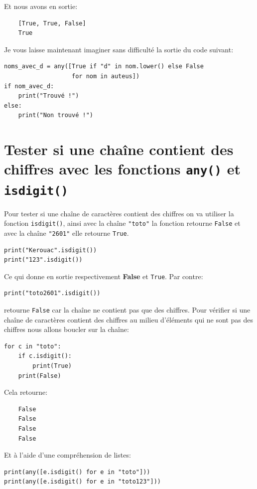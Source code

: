 \documentclass[a4paper,11pt]{book}
\begin{document}
Et nous avons en sortie:
\begin{verbatim}
    [True, True, False]
    True
\end{verbatim}
\medskip

Je vous laisse maintenant imaginer sans difficulté la sortie du code suivant:
\begin{lstlisting}
noms_avec_d = any([True if "d" in nom.lower() else False 
                   for nom in auteus])
if nom_avec_d:
    print("Trouvé !")
else:
    print("Non trouvé !")
\end{lstlisting}
\medskip

\section{Tester si une chaîne contient des chiffres avec les fonctions \texttt{any()} et \texttt{isdigit()}}
Pour tester si une chaîne de caractères contient des chiffres on va utiliser la fonction \texttt{isdigit()}, ainsi avec la chaîne \verb|"toto"| la fonction retourne \texttt{False} et avec la chaîne \verb|"2601"| elle retourne \texttt{True}.
\begin{lstlisting}
print("Kerouac".isdigit())
print("123".isdigit())
\end{lstlisting}
\medskip

Ce qui donne en sortie respectivement \textbf{False} et \texttt{True}. Par contre:
\begin{lstlisting}
print("toto2601".isdigit())
\end{lstlisting}
\medskip

retourne \texttt{False} car la chaîne ne contient pas que des chiffres. Pour vérifier si une chaîne de caractères contient des chiffres au milieu d'éléments qui ne sont pas des chiffres nous allons boucler sur la chaîne:
\begin{lstlisting}
for c in "toto":
    if c.isdigit():
        print(True)
    print(False)
\end{lstlisting}
\medskip

Cela retourne:
\begin{verbatim}
    False
    False
    False
    False
\end{verbatim}
\medskip

Et à l'aide d'une compréhension de listes:
\begin{lstlisting}
print(any([e.isdigit() for e in "toto"]))
print(any([e.isdigit() for e in "toto123"]))
\end{lstlisting}
\medskip
\end{document}
